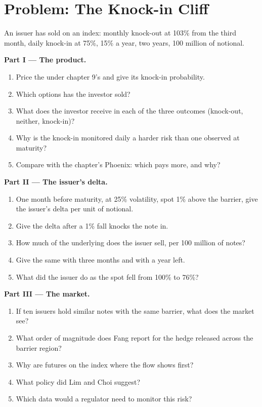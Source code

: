\section{Problem: The Knock-in Cliff}

\begin{problem}\label{pb:dv:autocallables:1}
An issuer has sold  on an index: monthly knock-out at 103\% from the third month, daily knock-in at 75\%, 15\% a year, two
years, 100 million of notional.

\medskip\noindent\textbf{Part I --- The product.}
\begin{enumerate}
\item Price the  under chapter 9's  and give its knock-in probability.
\item Which options has the investor sold?
\item What does the investor receive in each of the three outcomes (knock-out, neither, knock-in)?
\item Why is the knock-in monitored daily a harder risk than one observed at maturity?
\item Compare with the chapter's Phoenix: which pays more, and why?
\end{enumerate}

\medskip\noindent\textbf{Part II --- The issuer's delta.}
\begin{enumerate}[resume]
\item One month before maturity, at 25\% volatility, spot 1\% above the barrier, give the issuer's delta per unit of notional.
\item Give the delta after a 1\% fall knocks the note in.
\item How much of the underlying does the issuer sell, per 100 million of notes?
\item Give the same with three months and with a year left.
\item What did the issuer do as the spot fell from 100\% to 76\%?
\end{enumerate}

\medskip\noindent\textbf{Part III --- The market.}
\begin{enumerate}[resume]
\item If ten issuers hold similar notes with the same barrier, what does the market see?
\item What order of magnitude does Fang report for the hedge released across the barrier region?
\item Why are futures on the index where the flow shows first?
\item What policy did Lim and Choi suggest?
\item Which data would a regulator need to monitor this risk?
\end{enumerate}


\end{problem}
